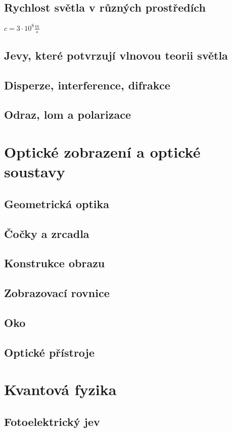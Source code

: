 \documentclass[titlepage]{book}
\begin{document}
\section{Rychlost světla v různých prostředích}
$c = 3 \cdot 10^8 \frac{m}{s}$\\

\section{Jevy, které potvrzují vlnovou teorii světla}
\section{Disperze, interference, difrakce}
\section{Odraz, lom a polarizace}
\chapter{Optické zobrazení a optické soustavy}
\section{Geometrická optika}
\section{Čočky a zrcadla}
\section{Konstrukce obrazu}
\section{Zobrazovací rovnice}
\section{Oko}
\section{Optické přístroje}
\chapter{Kvantová fyzika}
\section{Fotoelektrický jev}
\end{document}
